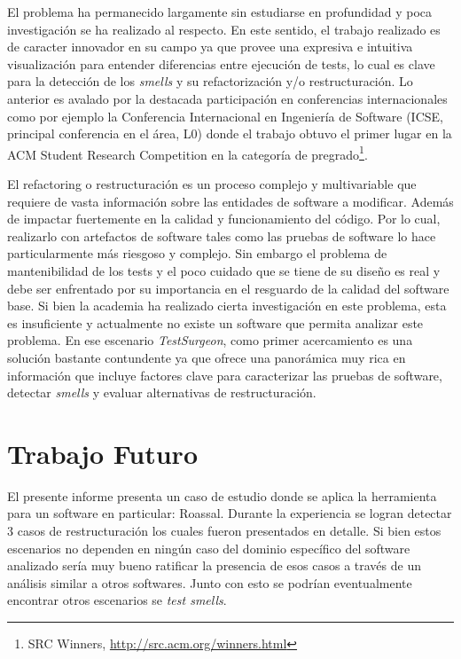 \par El problema ha permanecido largamente sin estudiarse en profundidad y poca investigación se ha realizado al respecto. En este sentido, el trabajo realizado es de caracter innovador en su campo ya que provee una expresiva e intuitiva visualización para entender diferencias entre ejecución de tests, lo cual es clave para la detección de los \emph{smells} y su refactorización y/o restructuración. Lo anterior es avalado por la destacada participación en conferencias internacionales como por ejemplo la Conferencia Internacional en Ingeniería de Software (ICSE, principal conferencia en el área, L0) donde el trabajo obtuvo el primer lugar en la ACM Student Research Competition en la categoría de pregrado\footnote{SRC Winners, \url{http://src.acm.org/winners.html}}.  

\par El refactoring o restructuración es un proceso complejo y multivariable que requiere de vasta información sobre las entidades de software a modificar. Además de impactar fuertemente en la calidad y funcionamiento del código. Por lo cual, realizarlo con artefactos de software tales como las pruebas de software lo hace particularmente más riesgoso y complejo. Sin embargo el problema de mantenibilidad de los tests y el poco cuidado que se tiene de su diseño es real y debe ser enfrentado por su importancia en el resguardo de la calidad del software base. Si bien la academia ha realizado cierta investigación en este problema, esta es insuficiente y actualmente no existe un software que permita analizar este problema. En ese escenario \emph{TestSurgeon}, como primer acercamiento es una solución bastante contundente ya que ofrece una panorámica muy rica en información que incluye factores clave para caracterizar las pruebas de software, detectar \emph{smells} y evaluar alternativas de restructuración.


\section{Trabajo Futuro}

\par El presente informe presenta un caso de estudio donde se aplica la herramienta para un software en particular: Roassal. Durante la experiencia se logran detectar 3 casos de restructuración los cuales fueron presentados en detalle. Si bien estos escenarios no dependen en ningún caso del dominio específico del software analizado sería muy bueno ratificar la presencia de esos casos a través de un análisis similar a otros softwares. Junto con esto se podrían eventualmente encontrar otros escenarios se \emph{test smells}.

